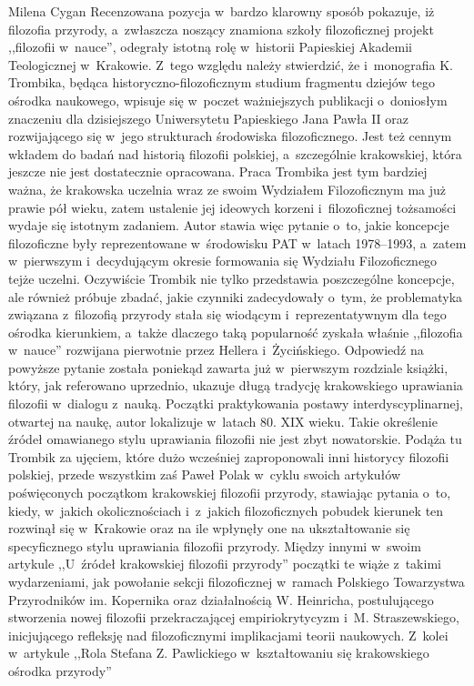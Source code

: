 \begin{newrevplenv}{Milena Cygan}
Recenzowana pozycja w~bardzo klarowny sposób pokazuje, iż filozofia przyrody, a~zwłaszcza noszący znamiona szkoły filozoficznej projekt ,,filozofii w~nauce'', odegrały istotną rolę w~historii Papieskiej Akademii Teologicznej w~Krakowie. Z~tego względu należy stwierdzić, że i~monografia K. Trombika, będąca historyczno-filozoficznym studium fragmentu dziejów tego ośrodka naukowego, wpisuje się w~poczet ważniejszych publikacji o~doniosłym znaczeniu dla dzisiejszego Uniwersytetu Papieskiego Jana Pawła II oraz rozwijającego się w~jego strukturach środowiska filozoficznego. Jest też cennym wkładem do badań nad historią filozofii polskiej, a~szczególnie krakowskiej, która jeszcze nie jest dostatecznie opracowana. Praca Trombika jest tym bardziej ważna, że krakowska uczelnia wraz ze swoim Wydziałem Filozoficznym ma już prawie pół wieku, zatem ustalenie jej ideowych korzeni i~filozoficznej tożsamości wydaje się istotnym zadaniem. Autor stawia więc pytanie o~to, jakie koncepcje filozoficzne były reprezentowane w~środowisku PAT w~latach 1978--1993, a~zatem w~pierwszym i~decydującym okresie formowania się Wydziału Filozoficznego tejże uczelni. Oczywiście Trombik nie tylko przedstawia poszczególne koncepcje, ale również próbuje zbadać, jakie czynniki zadecydowały o~tym, że problematyka związana z~filozofią przyrody stała się wiodącym i~reprezentatywnym dla tego ośrodka kierunkiem, a~także dlaczego taką popularność zyskała właśnie ,,filozofia w~nauce'' rozwijana pierwotnie przez Hellera i~Życińskiego. Odpowiedź na powyższe pytanie została poniekąd zawarta już w~pierwszym rozdziale książki, który, jak referowano uprzednio, ukazuje długą tradycję krakowskiego uprawiania filozofii w~dialogu z~nauką. Początki praktykowania postawy interdyscyplinarnej, otwartej na naukę, autor lokalizuje w~latach 80. XIX wieku. Takie określenie źródeł omawianego stylu uprawiania filozofii nie jest zbyt nowatorskie. Podąża tu Trombik za ujęciem, które dużo wcześniej zaproponowali inni historycy filozofii polskiej, przede wszystkim zaś Paweł Polak w~cyklu swoich artykułów poświęconych początkom krakowskiej filozofii przyrody, stawiając pytania o~to, kiedy, w~jakich okolicznościach i~z~jakich filozoficznych pobudek kierunek ten rozwinął się w~Krakowie oraz na ile wpłynęły one na ukształtowanie się specyficznego stylu uprawiania filozofii przyrody. Między innymi w~swoim artykule ,,U~źródeł krakowskiej filozofii przyrody''
\parencite[][s.~135]{polak_u_2011} %
 początki te wiąże z~takimi wydarzeniami, jak powołanie sekcji filozoficznej w~ramach Polskiego Towarzystwa Przyrodników im. Kopernika oraz działalnością W. Heinricha, postulującego stworzenia nowej filozofii przekraczającej empiriokrytycyzm i~M. Straszewskiego, inicjującego refleksję nad filozoficznymi implikacjami teorii naukowych. Z~kolei w~artykule ,,Rola Stefana Z. Pawlickiego w~kształtowaniu się krakowskiego ośrodka przyrody''

\end{newrevplenv}
